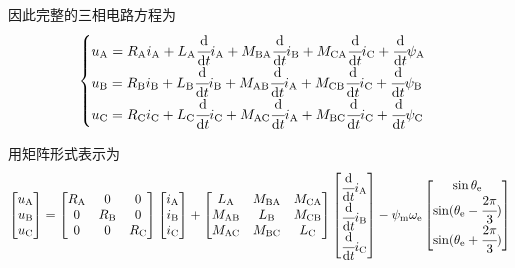 因此完整的三相电路方程为
\begin{equation*}
    \begin{cases}
        u_{\mathrm{A}}=R_{\mathrm{A}}i_{\mathrm{A}}+L_{\mathrm{A}}\cfrac{\mathrm{d}}{\mathrm{d} t}i_{\mathrm{A}}+M_{\mathrm{BA}}\cfrac{\mathrm{d}}{\mathrm{d} t}i_{\mathrm{B}}+M_{\mathrm{CA}}
        \cfrac{\mathrm{d}}{\mathrm{d} t}i_{\mathrm{C}}+\cfrac{\mathrm{d}}{\mathrm{d} t}\psi_{\mathrm{A}}\\
        u_{\mathrm{B}}=R_{\mathrm{B}}i_{\mathrm{B}}+L_{\mathrm{B}}\cfrac{\mathrm{d}}{\mathrm{d} t}i_{\mathrm{B}}+M_{\mathrm{AB}}\cfrac{\mathrm{d}}{\mathrm{d} t}i_{\mathrm{A}}+M_{\mathrm{CB}}
        \cfrac{\mathrm{d}}{\mathrm{d} t}i_{\mathrm{C}}+\cfrac{\mathrm{d}}{\mathrm{d} t}\psi_{\mathrm{B}}\\
        u_{\mathrm{C}}=R_{\mathrm{C}}i_{\mathrm{C}}+L_{\mathrm{C}}\cfrac{\mathrm{d}}{\mathrm{d} t}i_{\mathrm{C}}+M_{\mathrm{AC}}\cfrac{\mathrm{d}}{\mathrm{d} t}i_{\mathrm{A}}+M_{\mathrm{BC}}
        \cfrac{\mathrm{d}}{\mathrm{d} t}i_{\mathrm{C}}+\cfrac{\mathrm{d}}{\mathrm{d} t}\psi_{\mathrm{C}}
    \end{cases}
\end{equation*}

用矩阵形式表示为
\begin{equation*}
    \begin{bmatrix}
        u_{\mathrm{A}}\\u_{\mathrm{B}}\\u_{\mathrm{C}}
    \end{bmatrix}
    =
    \begin{bmatrix}
        R_{\mathrm{A}}&0&0\\0&R_{\mathrm{B}}&0\\0&0&R_{\mathrm{C}}
    \end{bmatrix}
    \begin{bmatrix}
        i_{\mathrm{A}}\\i_{\mathrm{B}}\\i_{\mathrm{C}}
    \end{bmatrix}
    +
    \begin{bmatrix}
        L_{\mathrm{A}}&M_{\mathrm{BA}}&M_{\mathrm{CA}}\\
        M_{\mathrm{AB}}&L_{\mathrm{B}}&M_{\mathrm{CB}}\\
        M_{\mathrm{AC}}&M_{\mathrm{BC}}&L_{\mathrm{C}}
    \end{bmatrix}
    \begin{bmatrix}
        \cfrac{\mathrm{d}}{\mathrm{d} t}i_{\mathrm{A}}\\
        \cfrac{\mathrm{d}}{\mathrm{d} t}i_{\mathrm{B}}\\
        \cfrac{\mathrm{d}}{\mathrm{d} t}i_{\mathrm{C}}
    \end{bmatrix}
    -
    \psi_{\mathrm{m}}\omega_{\mathrm{e}}
    \begin{bmatrix}
        \sin\theta_{\mathrm{e}}\\
        \sin(\theta_{\mathrm{e}}-\cfrac{2\pi}{3})\\
        \sin(\theta_{\mathrm{e}}+\cfrac{2\pi}{3})
    \end{bmatrix}
\end{equation*}

